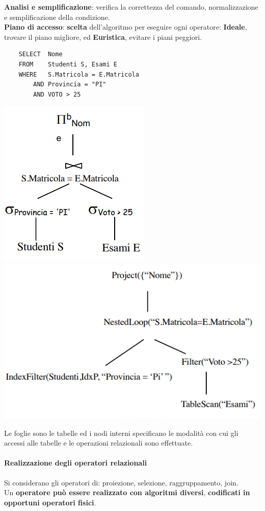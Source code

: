 \documentclass[10pt]{book}
\begin{document}
\begin{multicols}{2}
	\columnbreak
	\textbf{Analisi e semplificazione}: verifica la correttezza del comando, normalizzazione e semplificazione della condizione.\\
	\textbf{Piano di accesso}: \textbf{scelta} dell'algoritmo per eseguire ogni operatore: \textbf{Ideale}, trovare il piano migliore, ed \textbf{Euristica}, evitare i piani peggiori.
	\begin{lstlisting}
	SELECT	Nome
	FROM	Studenti S, Esami E
	WHERE	S.Matricola = E.Matricola
		AND Provincia = "PI"
		AND VOTO > 25
	\end{lstlisting}
	\begin{center}
		\includegraphics[scale=0.5]{ottimizzazese.png}\\
		\includegraphics[scale=0.5]{ottimizzazese2.png}
	\end{center}
	Le foglie sono le tabelle ed i nodi interni specificano le modalità con cui gli accessi alle tabelle e le operazioni relazionali sono effettuate.
\end{multicols}
\paragraph{Realizzazione degli operatori relazionali} Si considerano gli operatori di: proiezione, selezione, raggruppamento, join.\\
Un \textbf{operatore può essere realizzato con algoritmi diversi}, \textbf{codificati in opportuni operatori fisici}.
\end{document}
